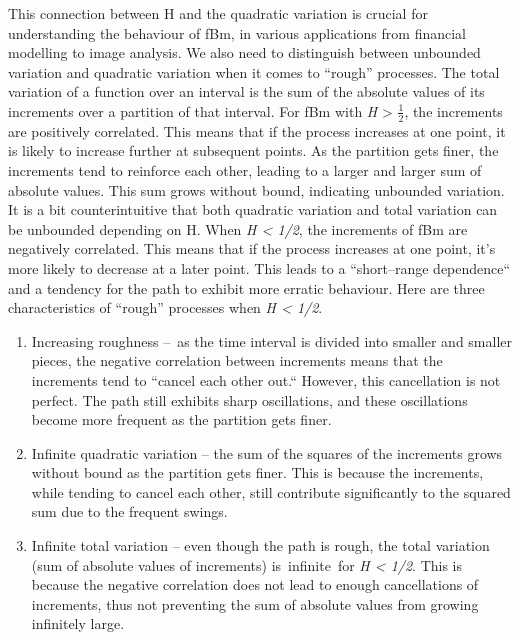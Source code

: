\documentclass[12pt,a4paper]{report}
\numberwithin{equation}{section}
\begin{document}
This connection between H and the quadratic variation is crucial for
understanding the behaviour of fBm, in various applications from
financial modelling to image analysis. We also need to distinguish
between unbounded variation and quadratic variation when it comes to
``rough'' processes. The total variation of a function over an interval
is the sum of the absolute values of its increments over a partition of
that interval. For fBm with \emph{H} \textgreater{} $\frac{1}{2}$, the increments
are positively correlated. This means that if the process increases at
one point, it is likely to increase further at subsequent points. As the
partition gets finer, the increments tend to reinforce each other,
leading to a larger and larger sum of absolute values. This sum grows
without bound, indicating unbounded variation. It is a bit
counterintuitive that both quadratic variation and total variation can
be unbounded depending on H. When \emph{H \textless{} 1/2}, the
increments of fBm are negatively correlated. This means that if the
process increases at one point, it's more likely to decrease at a later
point. This leads to a ``short--range dependence`` and a tendency for the
path to exhibit more erratic behaviour. Here are three characteristics
of ``rough'' processes when \emph{H \textless{} 1/2}.

\begin{enumerate}
\def\labelenumi{\roman{enumi}.}
\item
  Increasing roughness --~as the time interval is divided into smaller
  and smaller pieces, the negative correlation between increments means
  that the increments tend to ``cancel each other out.`` However, this
  cancellation is not perfect. The path still exhibits sharp
  oscillations, and these oscillations
  become more frequent as the partition gets finer.
\item
  Infinite quadratic variation -- the sum of the squares of the
  increments grows without bound as the partition gets finer. This is
  because the increments, while tending to cancel each other, still
  contribute significantly to the squared sum due to the frequent
  swings.
\item
  Infinite total variation -- even though the path is rough, the total
  variation (sum of absolute values of increments) is~infinite~for
  \emph{H \textless{} 1/2}. This is because the negative correlation
  does not lead to enough cancellations of increments, thus not
  preventing the sum of absolute values from growing infinitely large.
\end{enumerate}
\end{document}
